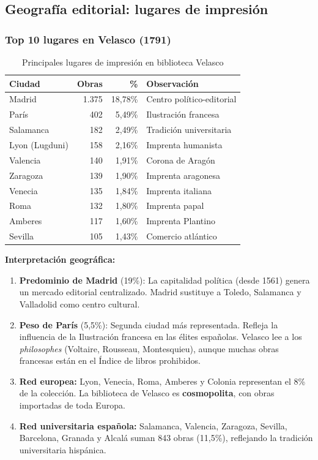 \documentclass[12pt,a4paper]{article}
\begin{document}
\subsection{Geografía editorial: lugares de impresión}

\subsubsection{Top 10 lugares en Velasco (1791)}

\begin{table}[h]
\centering
\begin{tabular}{lrrl}
\toprule
\textbf{Ciudad} & \textbf{Obras} & \textbf{\%} & \textbf{Observación} \\
\midrule
Madrid & 1.375 & 18,78\% & Centro político-editorial \\
París & 402 & 5,49\% & Ilustración francesa \\
Salamanca & 182 & 2,49\% & Tradición universitaria \\
Lyon (Lugduni) & 158 & 2,16\% & Imprenta humanista \\
Valencia & 140 & 1,91\% & Corona de Aragón \\
Zaragoza & 139 & 1,90\% & Imprenta aragonesa \\
Venecia & 135 & 1,84\% & Imprenta italiana \\
Roma & 132 & 1,80\% & Imprenta papal \\
Amberes & 117 & 1,60\% & Imprenta Plantino \\
Sevilla & 105 & 1,43\% & Comercio atlántico \\
\bottomrule
\end{tabular}
\caption{Principales lugares de impresión en biblioteca Velasco}
\end{table}

\textbf{Interpretación geográfica:}

\begin{enumerate}
\item \textbf{Predominio de Madrid} (19\%): La capitalidad política (desde 1561) genera un mercado editorial centralizado. Madrid sustituye a Toledo, Salamanca y Valladolid como centro cultural.

\item \textbf{Peso de París} (5,5\%): Segunda ciudad más representada. Refleja la influencia de la Ilustración francesa en las élites españolas. Velasco lee a los \textit{philosophes} (Voltaire, Rousseau, Montesquieu), aunque muchas obras francesas están en el Índice de libros prohibidos.

\item \textbf{Red europea:} Lyon, Venecia, Roma, Amberes y Colonia representan el 8\% de la colección. La biblioteca de Velasco es \textbf{cosmopolita}, con obras importadas de toda Europa.

\item \textbf{Red universitaria española:} Salamanca, Valencia, Zaragoza, Sevilla, Barcelona, Granada y Alcalá suman 843 obras (11,5\%), reflejando la tradición universitaria hispánica.
\end{enumerate}
\end{document}
